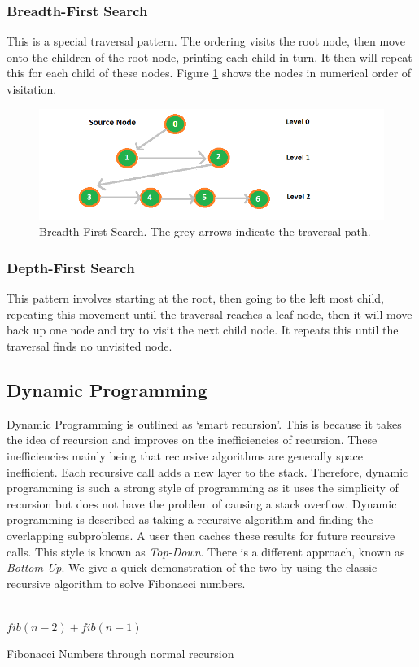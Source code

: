 \documentclass[conference]{IEEEtran}
\begin{document}
\subsubsection{Breadth-First Search}
This is a special traversal pattern. The ordering visits the root node, then move onto the children of the root node, printing each child in turn. It then will repeat this for each child of these nodes. Figure \ref{fig:breadth} shows the nodes in numerical order of visitation.
\begin{figure}[h]
\includegraphics[scale=0.5]{bfs}
\caption{Breadth-First Search. The grey arrows indicate the traversal path.}
\label{fig:breadth}
\end{figure}
 
\subsubsection{Depth-First Search}
This pattern involves starting at the root, then going to the left most child, repeating this movement until the traversal reaches a leaf node, then it will move back up one node and try to visit the next child node. It repeats this until the traversal finds no unvisited node.


\subsection{Dynamic Programming}
Dynamic Programming is outlined as `smart recursion'. This is because it takes the idea of recursion and improves on the inefficiencies of recursion. These inefficiencies mainly being that recursive algorithms are generally space inefficient. Each recursive call adds a new layer to the stack. Therefore, dynamic programming is such a strong style of programming as it uses the simplicity of recursion but does not have the problem of causing a stack overflow. Dynamic programming is described as taking a recursive algorithm and finding the overlapping subproblems. A user then caches these results for future recursive calls.
This style is known as \textit{Top-Down}. There is a different approach, known as \textit{Bottom-Up}. We give a quick demonstration of the two by using the classic recursive algorithm to solve Fibonacci numbers.
\IncMargin{1em}
	\begin{algorithm}
	\LinesNumbered
		
		 {\\}
		\Return $fib(n-2) + fib(n-1)$
			
	\caption{Fibonacci Numbers through normal recursion}
	\end{algorithm}
\DecMargin{1em}
	
\end{document}
